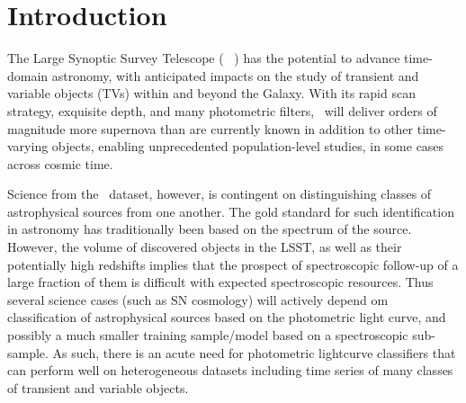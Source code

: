 \section{Introduction}
\label{sec:intro}


The Large Synoptic Survey Telescope ( \lsst\ ) has the potential to advance time-domain astronomy, with anticipated impacts on the study of transient and variable objects (TVs) within and beyond the Galaxy.
With its rapid scan strategy, exquisite depth, and many photometric filters, \lsst\ will deliver orders of magnitude more supernova than are currently known in addition to  other time-varying objects, enabling unprecedented population-level studies, in some cases across cosmic time.

Science from the \lsst\ dataset, however, is contingent on distinguishing classes of astrophysical sources
 from one another. The gold standard for such identification in astronomy has traditionally been
based on the spectrum of the source. However, the volume of discovered objects in the LSST, as well as their potentially high redshifts implies that the prospect of spectroscopic follow-up of a large fraction of them is difficult
with expected spectroscopic resources. Thus several science cases (such as SN cosmology) will actively depend om classification of astrophysical sources based on the photometric light curve, and possibly a much smaller training sample/model based on a spectroscopic sub-sample. 
As such, there is an acute need for photometric lightcurve classifiers that can perform well on  heterogeneous datasets including time series of many classes of transient and variable objects.


